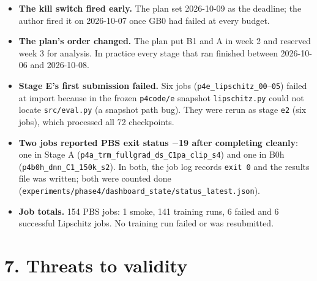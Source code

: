 \documentclass[11pt]{article}
\begin{document}
\begin{itemize}
\item \textbf{The kill switch fired early.} The plan set 2026-10-09 as the deadline; the author fired it on 2026-10-07 once GB0 had failed at every budget.
\item \textbf{The plan's order changed.} The plan put B1 and A in week 2 and reserved week 3 for analysis. In practice every stage that ran finished between 2026-10-06 and 2026-10-08.
\item \textbf{Stage E's first submission failed.} Six jobs (\texttt{p4e\_\allowbreak{}lipschitz\_\allowbreak{}00}--\texttt{05}) failed at import because in the frozen \texttt{p4code/e} snapshot \texttt{lipschitz.py} could not locate \texttt{src/eval.py} (a snapshot path bug). They were rerun as stage \texttt{e2} (six jobs), which processed all 72 checkpoints.
\item \textbf{Two jobs reported PBS exit status $-$19 after completing cleanly}: one in Stage A (\texttt{p4a\_\allowbreak{}trm\_\allowbreak{}fullgrad\_\allowbreak{}ds\_\allowbreak{}C1pa\_\allowbreak{}clip\_\allowbreak{}s4}) and one in B0h (\texttt{p4b0h\_\allowbreak{}dnn\_\allowbreak{}C1\_\allowbreak{}150k\_\allowbreak{}s2}). In both, the job log records \texttt{exit 0} and the results file was written; both were counted done (\texttt{experiments/\allowbreak{}phase4/\allowbreak{}dashboard\_\allowbreak{}state/\allowbreak{}status\_\allowbreak{}latest.\allowbreak{}json}).
\item \textbf{Job totals.} 154 PBS jobs: 1 smoke, 141 training runs, 6 failed and 6 successful Lipschitz jobs. No training run failed or was resubmitted.
\end{itemize}



\section*{7. Threats to validity}
\end{document}
